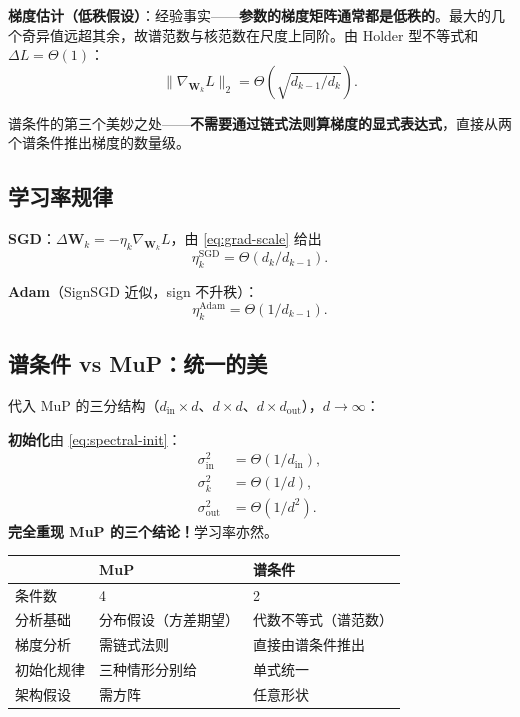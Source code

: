 \documentclass[11pt,a4paper]{ctexart}
\theoremstyle{definition}
\theoremstyle{remark}
\newcommand{\bigT}{\Theta}
\begin{document}
\textbf{梯度估计（低秩假设）}：经验事实——\textbf{参数的梯度矩阵通常都是低秩的}。最大的几个奇异值远超其余，故谱范数与核范数在尺度上同阶。由 Holder 型不等式和 $\Delta L = \bigT(1)$：
\begin{equation}
\boxed{\|\nabla_{\bm{W}_k}L\|_2 = \bigT\!\left(\sqrt{d_{k-1}/d_k}\right).}
\label{eq:grad-scale}
\end{equation}
 
\begin{keyinsight}
谱条件的第三个美妙之处——\textbf{不需要通过链式法则算梯度的显式表达式}，直接从两个谱条件推出梯度的数量级。
\end{keyinsight}
 
\subsection{学习率规律}
 
\textbf{SGD}：$\Delta\bm{W}_k = -\eta_k \nabla_{\bm{W}_k}L$，由 \eqref{eq:grad-scale} 给出
\[
\eta_k^{\text{SGD}} = \bigT\!\left(d_k/d_{k-1}\right).
\]
 
\textbf{Adam}（SignSGD 近似，sign 不升秩）：
\[
\eta_k^{\text{Adam}} = \bigT\!\left(1/d_{k-1}\right).
\]
 
\subsection{谱条件 vs MuP：统一的美}
 
代入 MuP 的三分结构（$d_\text{in} \times d$、$d \times d$、$d \times d_\text{out}$），$d\to\infty$：
 
\textbf{初始化}由 \eqref{eq:spectral-init}：
\begin{align*}
\sigma_\text{in}^2 &= \bigT(1/d_\text{in}), \\
\sigma_k^2 &= \bigT(1/d), \\
\sigma_\text{out}^2 &= \bigT(1/d^2).
\end{align*}
\textbf{完全重现 MuP 的三个结论！}学习率亦然。
 
\begin{center}
\renewcommand{\arraystretch}{1.3}
\begin{tabular}{p{3.5cm}p{5cm}p{5cm}}
\toprule
 & \textbf{MuP} & \textbf{谱条件} \\
\midrule
条件数 & 4 & 2 \\
分析基础 & 分布假设（方差期望） & 代数不等式（谱范数） \\
梯度分析 & 需链式法则 & 直接由谱条件推出 \\
初始化规律 & 三种情形分别给 & 单式统一 \\
架构假设 & 需方阵 & 任意形状 \\
\bottomrule
\end{tabular}
\end{center}
 
\end{document}
